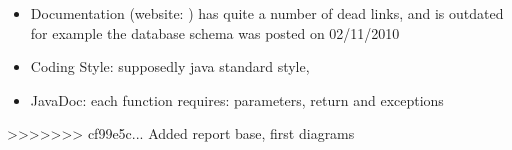 \documentclass[a4paper,11pt,titlepage]{article}
\begin{document}
\begin{itemize}
\item Documentation (website: ) has quite a number of dead links, and is outdated for example the database schema was posted on 02/11/2010
\item Coding Style: supposedly java standard style, %
\item JavaDoc: each function requires: parameters, return and exceptions %
\end{itemize}


>>>>>>> cf99e5c... Added report base, first diagrams
\end{document}

